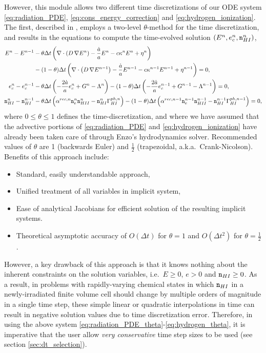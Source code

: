 \documentclass[letterpaper,10pt]{article}
\renewcommand{\(}{\left(}
\renewcommand{\)}{\right)}
\newcommand{\dt}{\Delta t}
\newcommand{\mn}{{\tt n}}
\begin{document}
However, this module allows two different time discretizations of our
ODE system \eqref{eq:radiation_PDE}, \eqref{eq:cons_energy_correction}
and \eqref{eq:hydrogen_ionization}.  The first, described in
\cite{ReynoldsHayesPaschosNorman2009}, employs a two-level
$\theta$-method for the time discretization, and results in the
equations to compute the time-evolved solution $(E^n,e_c^n,\mn_{HI}^n)$,
\begin{align}
  \label{eq:radiation_PDE_theta}
  E^n - E^{n-1} &- \theta\dt\left(\nabla\cdot\(D\,\nabla E^n\) - \frac{\dot{a}}{a} E^n -
    c\kappa^n E^n + \eta^n\right) \\ 
  \notag
  & - (1-\theta)\dt\left(\nabla\cdot\(D\,\nabla E^{n-1}\) - \frac{\dot{a}}{a} E^{n-1} -
    c\kappa^{n-1} E^{n-1} + \eta^{n-1}\right) = 0, \\ 
  \label{eq:energy_correction_theta}
  e_c^n - e_c^{n-1} &- \theta\dt\left(-\frac{2\dot{a}}{a}e_c^{n} + G^{n} -
    \Lambda^{n}\right) - (1-\theta)\dt\left(-\frac{2\dot{a}}{a}e_c^{n-1} + G^{n-1} -
    \Lambda^{n-1}\right) = 0, \\
  \label{eq:hydrogen_theta}
  \mn_{HI}^n - \mn_{HI}^{n-1} &-
    \theta\dt\left(\alpha^{rec,n} \mn_e^{n} \mn_{HII}^{n} -
      \mn_{HI}^{n} \Gamma_{HI}^{ph,n}\right) -
    (1-\theta)\dt\left(\alpha^{rec,n-1} \mn_e^{n-1} \mn_{HII}^{n-1} -
      \mn_{HI}^{n-1} \Gamma_{HI}^{ph,n-1}\right) = 0,
\end{align}
where $0\le\theta\le 1$ defines the time-discretization, and where we
have assumed that the advective portions of \eqref{eq:radiation_PDE}
and \eqref{eq:hydrogen_ionization} have already been taken care of
through Enzo's hydrodynamics solver.  Recommended values of $\theta$
are 1 (backwards Euler) and $\frac12$ (trapezoidal,
a.k.a.~Crank-Nicolson).  Benefits of this approach include:
\begin{itemize}
\item Standard, easily understandable approach,
\item Unified treatment of all variables in implicit system,
\item Ease of analytical Jacobians for efficient solution of the
  resulting implicit systems.
\item Theoretical asymptotic accuracy of $O(\dt)$ for $\theta=1$ and
  $O(\dt^2)$ for $\theta=\frac12$. 
\end{itemize}
However, a key drawback of this approach is that it knows nothing
about the inherent constraints on the solution variables, i.e.~$E\ge
0$, $e>0$ and $\mn_{HI}\ge 0$.  As a result, in problems with
rapidly-varying chemical states in which $\mn_{HI}$ in a
newly-irradiated finite volume cell should change by multiple orders 
of magnitude in a single time step, these simple linear or quadratic
interpolations in time can result in negative solution values due to
time discretization error.  Therefore, in using the above system 
\eqref{eq:radiation_PDE_theta}-\eqref{eq:hydrogen_theta}, it is
imperative that the user allow {\em very conservative} time step sizes
to be used (see section \ref{sec:dt_selection}).
\end{document}
